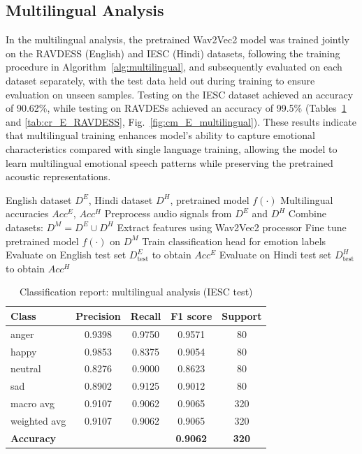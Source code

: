 \documentclass[runningheads]{llncs}
\begin{document}
\subsection{Multilingual Analysis}

In the multilingual analysis, the pretrained Wav2Vec2 model was trained jointly on the RAVDESS (English) and IESC (Hindi) datasets, following the training procedure in Algorithm~\ref{alg:multilingual}, and subsequently evaluated on each dataset separately, with the test data held out during training to ensure evaluation on unseen samples. Testing on the IESC dataset achieved an accuracy of 90.62\%, while testing on RAVDESs achieved an accuracy of 99.5\% (Tables~\ref{tab:cr_E_IESC} and \ref{tab:cr_E_RAVDESS}, Fig.~\ref{fig:cm_E_multilingual}). These results indicate that multilingual training enhances model's ability to capture emotional characteristics compared with single language training, allowing the model to learn multilingual emotional speech patterns while preserving the pretrained acoustic representations.

\begin{algorithm}[htbp]
\caption{Multilingual training for speech emotion recognition}
\label{alg:multilingual}
\begin{algorithmic}[1]
\Require English dataset $D^E$, Hindi dataset $D^H$, pretrained model $f(\cdot)$
\Ensure Multilingual accuracies $Acc^E$, $Acc^H$
\State Preprocess audio signals from $D^E$ and $D^H$
\State Combine datasets: $D^M = D^E \cup D^H$
\State Extract features using Wav2Vec2 processor
\State Fine tune pretrained model $f(\cdot)$ on $D^M$
\State Train classification head for emotion labels
\State Evaluate on English test set $D^E_{\mathrm{test}}$ to obtain $Acc^E$
\State Evaluate on Hindi test set $D^H_{\mathrm{test}}$ to obtain $Acc^H$
\end{algorithmic}
\end{algorithm}

\begin{table}[htbp]
\centering
\caption{Classification report: multilingual analysis (IESC test)}
\label{tab:cr_E_IESC}
\renewcommand{\arraystretch}{1.2}
\begin{tabular}{lcccc}
\toprule
\textbf{Class} & \textbf{Precision} & \textbf{Recall} & \textbf{F1 score} & \textbf{Support} \\
\midrule
anger         & 0.9398 & 0.9750 & 0.9571 & 80  \\
happy         & 0.9853 & 0.8375 & 0.9054 & 80  \\
neutral       & 0.8276 & 0.9000 & 0.8623 & 80  \\
sad           & 0.8902 & 0.9125 & 0.9012 & 80  \\
\midrule
macro avg     & 0.9107 & 0.9062 & 0.9065 & 320 \\
weighted avg  & 0.9107 & 0.9062 & 0.9065 & 320 \\
\midrule
\textbf{Accuracy} & & & \textbf{0.9062} & \textbf{320} \\
\bottomrule
\end{tabular}
\end{table}
\end{document}
